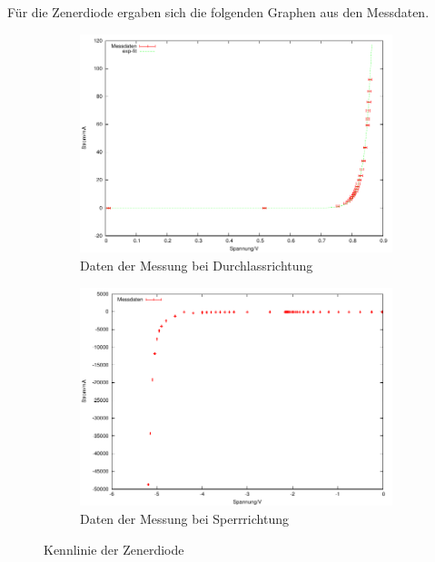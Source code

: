 \documentclass[12pt,a4paper]{article}
\begin{document}
Für die Zenerdiode ergaben sich die folgenden Graphen aus den Messdaten.

\begin{figure}[H]
        \centering
        \begin{subfigure}[b]{0.48\textwidth}
                \includegraphics[width=\textwidth , scale = 0.4]{a2_1.pdf}
                \caption[Daten der Messung bei Durchlassrichtung]{Daten der Messung bei Durchlassrichtung}
 				 \label{fig:a2_1}
        \end{subfigure}%
        \hfill
        \begin{subfigure}[b]{0.48\textwidth}
                \includegraphics[width=\textwidth , scale = 0.4]{a2_2.pdf}
                \caption[Daten der Messung bei Sperrrichtung]{Daten der Messung bei Sperrrichtung}
  				\label{fig:a2_2}
        \end{subfigure}
        \caption{Kennlinie der Zenerdiode}
        \label{fig:a1}
\end{figure}
\end{document}
